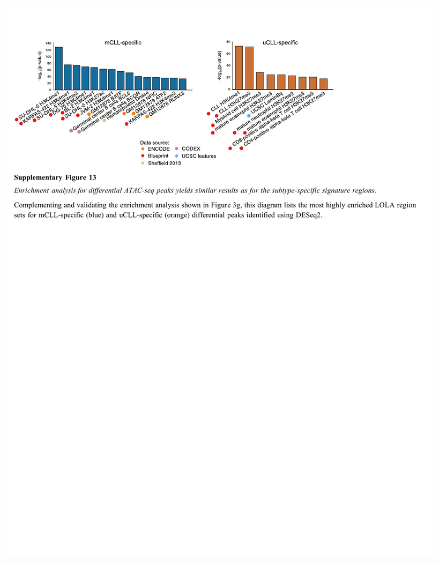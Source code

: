 \documentclass[10pt,]{article}
\begin{document}
\begin{figure}
\centering
\includegraphics[width=1.000\hsize]{figures/Supplementary_Information_13.pdf}
\end{figure}
\clearpage
\end{document}
